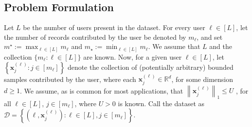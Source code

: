 


\subsection{Problem Formulation}
\label{sec:problem}
Let $L$ be the number of users present in the dataset. For every user $\ell\in [L]$, let the number of records contributed by the user be denoted by $m_\ell$, and set $m^\star:= \max_{\ell\in [L]} m_\ell$ and $m_\star:= \min_{\ell\in [L]} m_\ell$. We assume that $L$ and the collection $\{m_\ell: \ell \in [L]\}$ are known. Now, for a given user $\ell\in [L]$, let $\left\{\mathbf{x}_j^{(\ell)}: j\in [m_\ell]\right\}$ denote the collection of (potentially arbitrary) bounded samples contributed by the user, where each $\mathbf{x}_j^{(\ell)}\in \mathbb{R}^d$, for some dimension $d\geq 1$. We assume, as is common for most applications, that $\left \lVert \mathbf{x}_j^{(\ell)} \right \rVert_1 \leq U$ \cite{dpsgd,dp_spcom}, for all $\ell\in [L]$, $j\in [m_\ell]$, where $U> 0$ is known. Call the dataset as $\mathcal{D} = \left\{\left(\ell,\mathbf{x}_j^{(\ell)}\right): \ell \in [L], j\in [m_\ell]\right\}$.  

